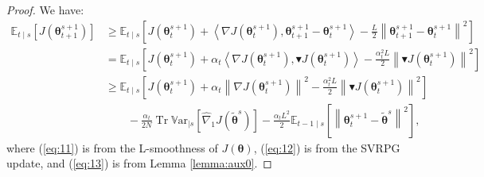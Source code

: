 \documentclass{article}
\theoremstyle{remark}
\theoremstyle{definition}
\DeclareMathOperator{\Tr}{Tr}
\newcommand{\norm}[2][\infty]{\left\|#2\right\|_{#1}}
\newcommand{\dotprod}[2]{\left\langle#1,#2\right\rangle}
\newcommand{\vtheta}{\boldsymbol{\theta}}
\newcommand{\gradJ}[1]{\nabla J(#1)}
\newcommand{\gradApp}[2]{\hat{\nabla}_{#2}J(#1)}
\newcommand{\Ets}[2][t]{\mathbb{E}_{#1\mid s}\left[#2\right]}
\newcommand{\Varts}[2][t]{{\mathbb{V}\text{ar}}_{#1\mid s}\left[#2\right]}
\newcommand{\gradBlack}[1]{\blacktriangledown J(#1)}
\begin{document}
\begin{proof}
	We have:
	\begin{align}
	\Ets{J(\vtheta_{t+1}^{s+1})} 
	&\geq \Ets{J(\vtheta_t^{s+1})+\dotprod{\gradJ{\vtheta_t^{s+1}}}{\vtheta_{t+1}^{s+1}-\vtheta_t^{s+1}} - \frac{L}{2}\norm[]{\vtheta_{t+1}^{s+1}-\vtheta_t^{s+1}}^2} \label{eq:11}\\
	&= \Ets{J(\vtheta_t^{s+1})+\alpha_t\dotprod{\gradJ{\vtheta_t^{s+1}}}{\gradBlack{\vtheta_t^{s+1}}} - \frac{\alpha_t^2L}{2}\norm[]{\gradBlack{\vtheta_t^{s+1}}}^2} \label{eq:12}\\
	&\geq
	\Ets{J(\vtheta_t^{s+1})+\alpha_t\norm[]{\gradJ{\vtheta_t^{s+1}}}^2 - \frac{\alpha_t^2L}{2}\norm[]{\gradBlack{\vtheta_t^{s+1}}}^2} \nonumber\\
	&\qquad-
	\frac{\alpha_t}{2N}\Tr\Varts[]{\gradApp{\tilde{\vtheta}^s}{1}} -\frac{\alpha_tL^2}{2}\Ets[t-1]{\norm[]{\vtheta_t^{s+1} - \tilde{\vtheta}^s}^2}, \label{eq:13}
\end{align}
where (\ref{eq:11}) is from the L-smoothness of $J(\vtheta)$, (\ref{eq:12}) is from the SVRPG update, and (\ref{eq:13}) is from Lemma \ref{lemma:aux0}.


\end{proof}
\end{document}
